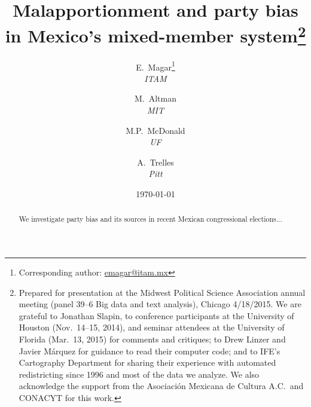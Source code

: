 \documentclass[letter,12pt]{article}
\begin{document}
\title{Malapportionment and party bias in Mexico's mixed-member system\thanks{Prepared for presentation at the Midwest Political Science Association annual meeting (panel 39--6 Big data and text analysis), Chicago 4/18/2015. We are grateful to Jonathan Slapin, to conference participants at the University of Houston (Nov.~14--15, 2014), and seminar attendees at the University of Florida (Mar.~13, 2015) for comments and critiques; to Drew Linzer and Javier M\'arquez for guidance to read their computer code; and to IFE's Cartography Department for sharing their experience with automated redistricting since 1996 and most of the data we analyze. We also acknowledge the support from the Asociaci\'on Mexicana de Cultura A.C.\ and CONACYT for this work.}}
\author{E.~Magar\footnote{Corresponding author: \url{emagar@itam.mx}} \\ \emph{ITAM} \and
        M.~Altman \\ \emph{MIT} \and
        M.P.~McDonald \\ \emph{UF} \and  
        A.~Trelles \\ \emph{Pitt}
      }
\date{\today}
\maketitle

\begin{abstract}
\noindent We investigate party bias and its sources in recent Mexican congressional elections...  
\end{abstract}
\end{document}
